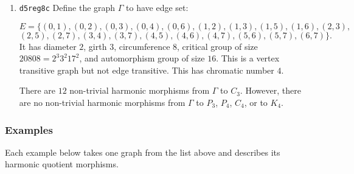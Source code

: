 \documentclass[12pt,letterpaper]{article}
\theoremstyle{definition}
\begin{document}
\begin{enumerate}
\item
  {\tt d5reg8c}\newline
  Define the graph  $\Gamma$
  to have edge set:

\[
E = \{
(0, 1), (0, 2), (0, 3), (0, 4), (0, 6), (1, 2), (1, 3), (1, 5), (1, 6), (2, 3),
\]
\[
(2, 5), (2, 7), (3, 4), (3, 7), (4, 5), (4, 6), (4, 7), (5, 6), (5, 7), (6, 7)
\}.
\]
It has diameter $2$,
girth $3$, circumference $8$, 
critical group of size $20808 = 2^3 3^2 17^2$, 
and automorphism group of size $16$. This is a vertex transitive graph but not
edge transitive.
This has chromatic number $4$.

There are $12$ non-trivial harmonic morphisms from $\Gamma$ to $C_3$.
However, there are no non-trivial harmonic morphisms from $\Gamma$ to $P_3$,
$P_4$, $C_4$, or to $K_4$.


\end{enumerate}



\subsubsection{Examples}

Each example below takes one graph from the list above and describes
its harmonic quotient morphisms.
\end{document}
